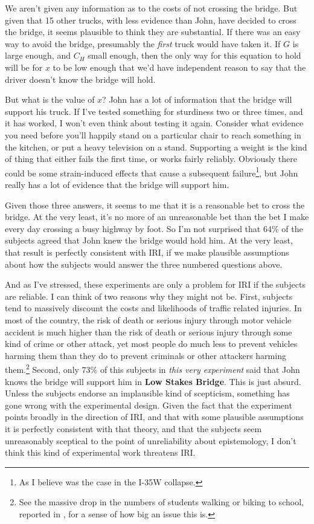 \documentclass[oneside]{book}
\begin{document}
We aren't given any information as to the costs of not crossing the bridge. But given that 15 other trucks, with less evidence than John, have decided to cross the bridge, it seems plausible to think they are substantial. If there was an easy way to avoid the bridge, presumably the \textit{first} truck would have taken it. If $G$ is large enough, and $C_H$ small enough, then the only way for this equation to hold will be for $x$ to be low enough that we'd have independent reason to say that the driver doesn't know the bridge will hold.

But what is the value of $x$? John has a lot of information that the bridge will support his truck. If I've tested something for sturdiness two or three times, and it has worked, I won't even think about testing it again. Consider what evidence you need before you'll happily stand on a particular chair to reach something in the kitchen, or put a heavy television on a stand. Supporting a weight is the kind of thing that either fails the first time, or works fairly reliably. Obviously there could be some strain-induced effects that cause a subsequent failure\footnote{As I believe was the case in the I-35W collapse.}, but John really has a lot of evidence that the bridge will support him.

Given those three answers, it seems to me that it is a reasonable bet to cross the bridge. At the very least, it's no more of an unreasonable bet than the bet I make every day crossing a busy highway by foot. So I'm not surprised that 64\% of the subjects agreed that John knew the bridge would hold him. At the very least, that result is perfectly consistent with IRI, if we make plausible assumptions about how the subjects would answer the three numbered questions above.

And as I've stressed, these experiments are only a problem for IRI if the subjects are reliable. I can think of two reasons why they might not be. First, subjects tend to massively discount the costs and likelihoods of traffic related injuries. In most of the country, the risk of death or serious injury through motor vehicle accident is much higher than the risk of death or serious injury through some kind of crime or other attack, yet most people do much less to prevent vehicles harming them than they do to prevent criminals or other attackers harming them.\footnote{See the massive drop in the numbers of students walking or biking to school, reported in \cite{Ham2008}, for a sense of how big an issue this is.} Second, only 73\% of this subjects in \textit{this very experiment} said that John knows the bridge will support him in \textbf{Low Stakes Bridge}. This is just absurd. Unless the subjects endorse an implausible kind of scepticism, something has gone wrong with the experimental design. Given the fact that the experiment points broadly in the direction of IRI, and that with some plausible assumptions it is perfectly consistent with that theory, and that the  subjects seem unreasonably sceptical to the point of unreliability about epistemology, I don't think this kind of experimental work threatens IRI.
\end{document}
